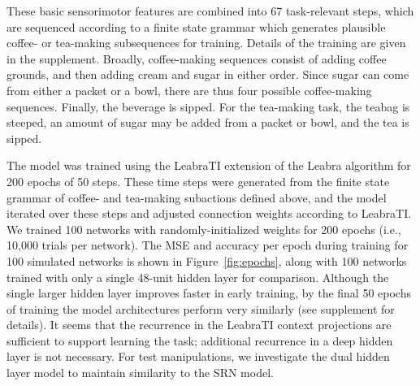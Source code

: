 \documentclass[10pt,letterpaper]{article}
\numberwithin{equation}{section}
\begin{document}
These basic sensorimotor features are combined into 67 task-relevant steps, which are sequenced according to a finite state grammar which generates plausible coffee- or tea-making subsequences for training. Details of the training are given in the supplement. Broadly, coffee-making sequences consist of adding coffee grounds, and then adding cream and sugar in either order. Since sugar can come from either a packet or a bowl, there are thus four possible coffee-making sequences. Finally, the beverage is sipped. For the tea-making task, the teabag is steeped, an amount of sugar may be added from a packet or bowl, and the tea is sipped.

The model was trained using the LeabraTI extension of the Leabra algorithm for 200 epochs of 50 steps. These time steps were generated from the finite state grammar of coffee- and tea-making subactions defined above, and the model iterated over these steps and adjusted connection weights according to LeabraTI. We trained 100 networks with randomly-initialized weights for 200 epochs (i.e., 10,000 trials per network). The MSE and accuracy per epoch during training for 100 simulated networks is shown in Figure~\ref{fig:epochs}, along with 100 networks trained with only a single 48-unit hidden layer for comparison. Although the single larger hidden layer improves faster in early training, by the final 50 epochs of training the model architectures perform very similarly (see supplement for details). It seems that the recurrence in the LeabraTI context projections are sufficient to support learning the task; additional recurrence in a deep hidden layer is not necessary. For test manipulations, we investigate the dual hidden layer model to maintain similarity to the SRN model.
\end{document}
